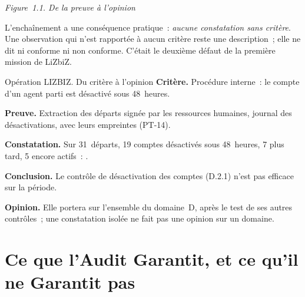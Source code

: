\begin{center}

\smallskip
{\small\itshape Figure~1.1. De la preuve à l'opinion}
\end{center}

L'enchaînement a une conséquence pratique~: \emph{aucune constatation sans
critère}. Une observation qui n'est rapportée à aucun critère reste une
description~; elle ne dit ni conforme ni non conforme. C'était le
deuxième défaut de la première mission de LiZbiZ.

\begin{boxscenario}{Opération LIZBIZ. Du critère à l'opinion}
\textbf{Critère.} Procédure interne~: le compte d'un agent parti est
désactivé sous 48~heures.

\textbf{Preuve.} Extraction des départs signée par les ressources
humaines, journal des désactivations, avec leurs empreintes (PT-14).

\textbf{Constatation.} Sur 31~départs, 19 comptes désactivés sous
48~heures, 7 plus tard, 5 encore actifs~: \NON{}.

\textbf{Conclusion.} Le contrôle de désactivation des comptes (D.2.1) n'est
pas efficace sur la période.

\textbf{Opinion.} Elle portera sur l'ensemble du domaine~D, après le test
de ses autres contrôles~; une constatation isolée ne fait pas une opinion
sur un domaine.
\end{boxscenario}

\section{Ce que l'Audit Garantit, et ce qu'il ne Garantit pas}
\label{sec:c01-assurance}

